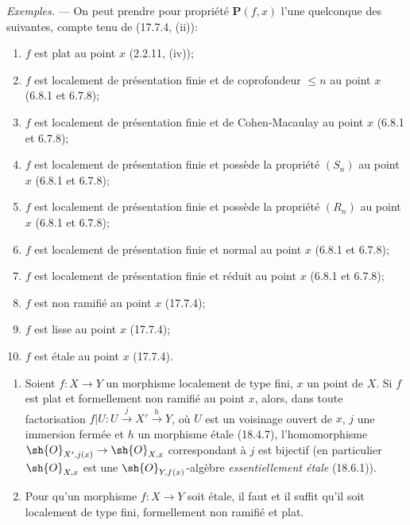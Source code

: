 \begin{env}[18.4.11]
\label{IV.18.4.11}
\emph{Exemples.} --- On peut prendre pour propriété $\mathbf P(f,x)$ l'une quelconque des suivantes, compte tenu de (17.7.4, (ii)):
\begin{enumerate}
  \item[(i)] $f$ est plat au point $x$ (2.2.11, (iv));
  \item[(ii)] $f$ est localement de présentation finie et de coprofondeur $\leq n$ au point $x$ (6.8.1 et 6.7.8);
  \item[(iii)] $f$ est localement de présentation finie et de Cohen-Macaulay au point $x$ (6.8.1 et 6.7.8);
  \item[(iv)] $f$ est localement de présentation finie et possède la propriété $(S_n)$ au point $x$ (6.8.1 et 6.7.8);
  \item[(v)] $f$ est localement de présentation finie et possède la propriété $(R_n)$ au point $x$ (6.8.1 et 6.7.8);
  \item[(vi)] $f$ est localement de présentation finie et normal au point $x$ (6.8.1 et 6.7.8);
  \item[(vii)] $f$ est localement de présentation finie et réduit au point $x$ (6.8.1 et 6.7.8);
  \item[(viii)] $f$ est non ramifié au point $x$ (17.7.4);
  \item[(ix)] $f$ est lisse au point $x$ (17.7.4);
  \item[(x)] $f$ est étale au point $x$ (17.7.4).
\end{enumerate}
\end{env}


\begin{corollary}[18.4.12]
\label{IV.18.4.12}
\begin{enumerate}
  \item[(i)] Soient $f:X\to Y$ un morphisme localement de type fini, $x$ un point de $X$. Si $f$ est plat et formellement non ramifié au point $x$, alors, dans toute factorisation $f|U:U\xrightarrow{j}X'\xrightarrow{h}Y$, où $U$ est un voisinage ouvert de $x$, $j$ une immersion fermée et $h$ un morphisme étale (18.4.7), l'homomorphisme $\sh{O}_{X',j(x)}\to\sh{O}_{X,x}$ correspondant à $j$ est bijectif (en particulier $\sh{O}_{X,x}$ est une $\sh{O}_{Y,f(x)}$-algèbre \emph{essentiellement étale} (18.6.1)).
  \item[(ii)] Pour qu'un morphisme $f:X\to Y$ soit étale, il faut et il suffit qu'il soit localement de type fini, formellement non ramifié et plat.
\end{enumerate}
\end{corollary}

